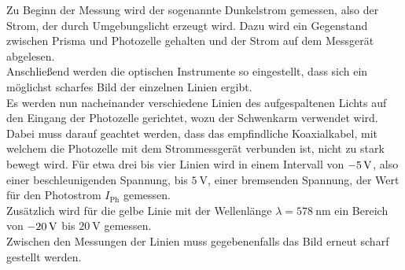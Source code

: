     Zu Beginn der Messung wird der sogenannte Dunkelstrom gemessen,
    also der Strom,
    der durch Umgebungslicht erzeugt wird.
    Dazu wird ein Gegenstand zwischen Prisma und Photozelle gehalten und der Strom auf dem Messgerät abgelesen.\\
    Anschließend werden die optischen Instrumente so eingestellt,
    dass sich ein möglichst scharfes Bild der einzelnen Linien ergibt.
    \\
    Es werden nun nacheinander verschiedene Linien des aufgespaltenen Lichts auf den Eingang der Photozelle gerichtet,
    wozu der Schwenkarm verwendet wird.
    Dabei muss darauf geachtet werden,
    dass das empfindliche Koaxialkabel,
    mit welchem die Photozelle mit dem Strommessgerät verbunden ist,
    nicht zu stark bewegt wird.
    Für etwa drei bis vier Linien wird in einem Intervall von $\SI{- 5}{\volt}$,
    also einer beschleunigenden Spannung,
    bis $\SI{5}{\volt}$,
    einer bremsenden Spannung,
    der Wert für den Photostrom $I_\text{Ph}$ gemessen.
    \\
    Zusätzlich wird für die gelbe Linie mit der Wellenlänge $\lambda = \SI{578}{\nano\meter}$ ein Bereich von
    $\SI{- 20}{\volt}$ bis $\SI{20}{\volt}$ gemessen.\\
    Zwischen den Messungen der Linien muss gegebenenfalls das Bild erneut scharf gestellt werden.
